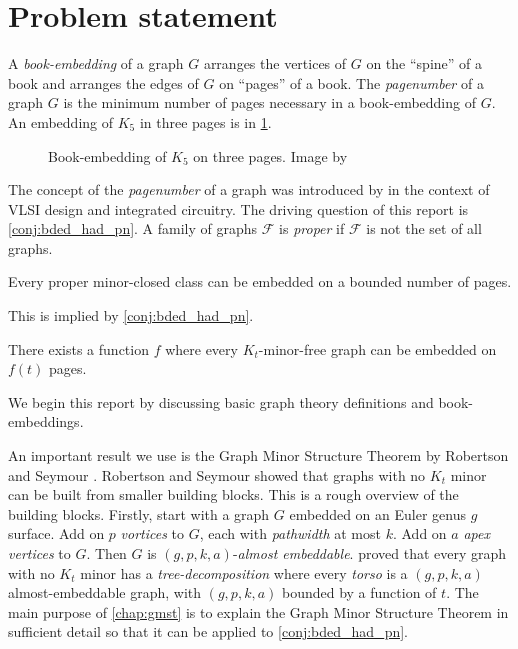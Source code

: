 \section{Problem statement}

A \textit{book-embedding} of a graph $G$ arranges the vertices of $G$ on the ``spine'' of a book and arranges the edges of $G$ on ``pages'' of a book. The \textit{pagenumber} of a graph \(G\) is the minimum number of pages necessary in a book-embedding of \(G\).
An embedding of $K_5$ in three pages is in \cref{fig:book-embedding}.

\begin{figure}[h!]
	\centering
	
	\caption[Three-page book-embedding of $K_5$]{Book-embedding of $K_5$ on three pages. Image by \textcite{eppsteinBookEmbedding2014}}\label{fig:book-embedding}
\end{figure}

The concept of the \textit{pagenumber} of a graph was introduced by \textcite{ollmannBookThicknessVarious1973} in the context of VLSI design and integrated circuitry. 
The driving question of this report is \cref{conj:bded_had_pn}. A family of graphs $\mathcal{F}$ is \textit{proper} if $\mathcal{F}$ is not the set of all graphs. 
\begin{conjecture}\label{lem:Minor-Closed_Pagenumber}
	Every proper minor-closed class can be embedded on a bounded number of pages.
\end{conjecture}

This is implied by \cref{conj:bded_had_pn}.

\begin{conjecture}\label{conj:bded_had_pn}
	There exists a function $f$ where every $K_t$-minor-free graph can be embedded on $f(t)$ pages.
\end{conjecture}

We begin this report by discussing basic graph theory definitions and book-embeddings.

An important result we use is the Graph Minor Structure Theorem by Robertson and Seymour \cite{robertsonGraphMinorsXVI2003}. Robertson and Seymour showed that graphs with no \(K_t\) minor can be built from smaller building blocks. This is a rough overview of the building blocks. Firstly, start with a graph \(G\) embedded on an Euler genus \(g\) surface. Add on \(p\) \textit{vortices} to \(G\), each with \textit{pathwidth} at most \(k\). Add on \(a\) \textit{apex vertices} to \(G\). Then \(G\) is \((g, p, k, a)\)-\textit{almost embeddable}. \textcite{robertsonGraphMinorsXVI2003} proved that every graph with no \(K_t\) minor has a \textit{tree-decomposition} where every \textit{torso} is a \((g, p, k, a)\) almost-embeddable graph, with \((g, p, k, a)\) bounded by a function of \(t\). The main purpose of \cref{chap:gmst} is to explain the Graph Minor Structure Theorem in sufficient detail so that it can be applied to \cref{conj:bded_had_pn}.

